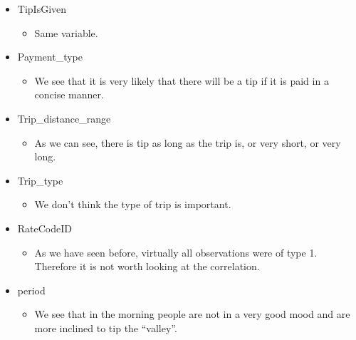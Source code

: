 \documentclass[
  18pt,
  a4paper]{article}
\providecommand{\tightlist}{%
  \setlength{\itemsep}{0pt}\setlength{\parskip}{0pt}}
\begin{document}
\begin{itemize}
\tightlist
\item
  TipIsGiven

  \begin{itemize}
  \tightlist
  \item
    Same variable.
  \end{itemize}
\item
  Payment\_type

  \begin{itemize}
  \tightlist
  \item
    We see that it is very likely that there will be a tip if it is paid
    in a concise manner.
  \end{itemize}
\item
  Trip\_distance\_range

  \begin{itemize}
  \tightlist
  \item
    As we can see, there is tip as long as the trip is, or very short,
    or very long.
  \end{itemize}
\item
  Trip\_type

  \begin{itemize}
  \tightlist
  \item
    We don't think the type of trip is important.
  \end{itemize}
\item
  RateCodeID

  \begin{itemize}
  \tightlist
  \item
    As we have seen before, virtually all observations were of type 1.
    Therefore it is not worth looking at the correlation.
  \end{itemize}
\item
  period

  \begin{itemize}
  \tightlist
  \item
    We see that in the morning people are not in a very good mood and
    are more inclined to tip the ``valley''.
  \end{itemize}
\end{itemize}
\end{document}
